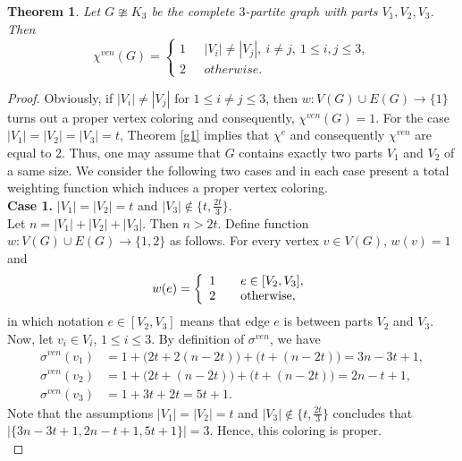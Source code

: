 \documentclass[12pt,a4paper]{article}
\newtheorem{theorem}{\bf Theorem}[section]
\begin{document}
\begin{theorem}\label{g2}
	Let $ G \ncong K_3 $ be  the complete $ 3$-partite graph with parts $ V_1, V_2, V_3 $. Then
	\begin{equation*}
	\chi^{ven}(G)=
	\left\{
	\begin{array}{cl}
	1 & \ \ \ |V_i|\neq|V_j|,\  i\neq j,\  1\leq i,j\leq 3,  \\
	2 & \ \ \ otherwise.
	\end{array}
	\right.
	\end{equation*}
\end{theorem}
\begin{proof}
 	Obviously, if $ |V_i|\neq|V_j| $ for $ 1\leq i\neq j\leq 3 $, then  $ w : V(G)\cup E(G) \rightarrow \{1\}$ turns out a proper vertex coloring and consequently, $ \chi^{ven}(G)=1 $. For the case $ |V_1|=|V_2|=|V_3|=t $,  Theorem \ref{g1} implies that $\chi^{e}$ and consequently $ \chi^{ven} $ are equal to 2.
	Thus, one may assume that $ G $ contains exactly two parts $ V_1 $ and $ V_2$ of a same size. We consider the following two cases and in each case present  a total weighting function  which induces a proper vertex coloring.\\
	
	\textbf{Case 1.}
	$ |V_1|= |V_2| =t $ and $ |V_3|\notin\{t,\frac{2t}{3}\} $.\\
	Let $n=|V_1|+|V_2|+|V_3|$. Then $n>2t$. Define function $ w:V(G)\cup E(G)\rightarrow \{1,2\} $ as follows. For every vertex $ v\in V(G) $, $ w(v)=1 $ and
	\begin{equation*}
	w(e)=
	\left\{
	\begin{array}{ll}
	1 & \ \ \ e\in [V_2,V_3],  \\
	2 & \ \ \ \rm{otherwise,}
	\end{array}
	\right.
	\end{equation*}
	in which  notation $ e\in [V_2,V_3]$  means that edge $e$ is between parts $V_2$ and $V_3$.
	Now, let $ v_i\in V_i $, $ 1\leq i\leq 3 $. By definition of $\sigma^{ven}$, we have
	\begin{align*}
	\sigma^{ven}(v_1) &=1+\big(2t+2(n-2t)\big)+\big(t+(n-2t)\big)=3n-3t+1,\\
	\sigma^{ven}(v_2)&=1+\big(2t+(n-2t)\big)+\big(t+(n-2t)\big)=2n-t+1,\\
	\sigma^{ven}(v_3)
	&=1+3t+2t=5t+1.
	\end{align*}
	Note that the assumptions $ |V_1|= |V_2| =t $ and $ |V_3|\notin\{t,\frac{2t}{3}\} $ concludes that $ \big|\{3n-3t+1, 2n-t+1, 5t+1\}\big|=3 $. Hence, this coloring is proper.\\
	

\end{proof}
\end{document}
